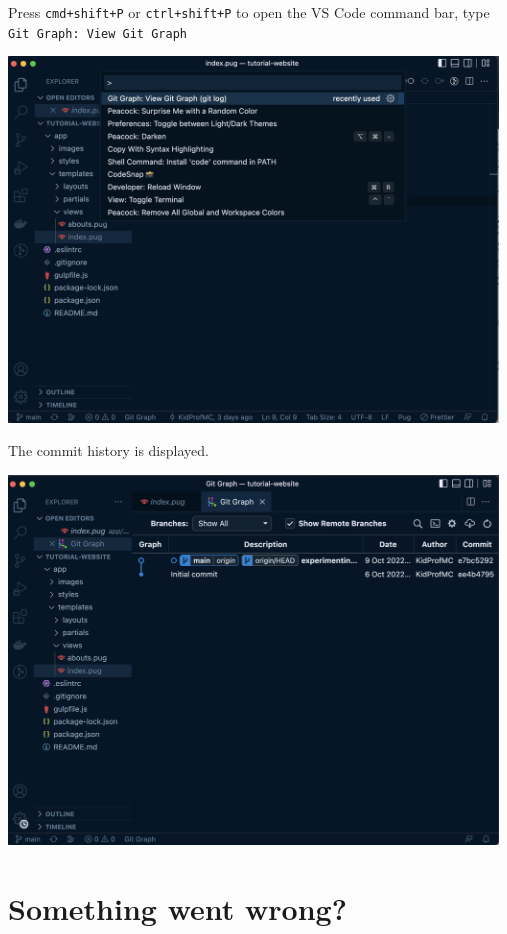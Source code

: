 Press \texttt{cmd+shift+P} or \texttt{ctrl+shift+P} to open the VS Code command bar, type \texttt{Git Graph: View Git Graph}

\begin{center}
\includegraphics[width=13cm]{images/ch3-gitgraph1.png}
\end{center}

The commit history is displayed.

\begin{center}
\includegraphics[width=13cm]{images/ch3-gitgraph2.png}
\end{center}

\section{Something went wrong?} 

